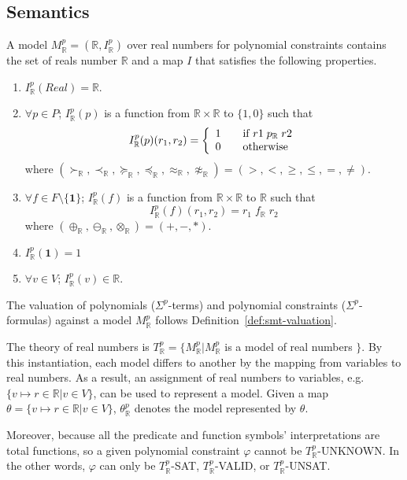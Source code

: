 \subsection{Semantics}
A model $M^p_{\mathbb{R}} = (\mathbb{R}, I^p_{\mathbb{R}})$ over real numbers for polynomial constraints contains the set of reals number $\mathbb{R}$ and a map $I$ that satisfies the following properties.
\begin{enumerate}
\item $I^p_{\mathbb{R}}(Real) = \mathbb{R}$.
\item $\forall p \in P$; $I^p_{\mathbb{R}}(p)$ is a function from $\mathbb{R} \times \mathbb{R}$ to $\{1, 0\}$ such that \[I^p_\mathbb{R}(p)(r_1, r_2) = \left\{ 
  \begin{array}{c l}
    1 & \quad \text{if } r1 \; p_{\mathbb{R}} \; r2\\
    0 & \quad \text{otherwise }\\
  \end{array} \right.\] where $(\succ_\mathbb{R}, \prec_{\mathbb{R}},\succeq_\mathbb{R},\preceq_{\mathbb{R}}, \approx_\mathbb{R}, \not\approx_\mathbb{R}) = (>, <, \ge, \le, =, \neq)$.
\item $\forall f \in F \setminus \{\mathbf{1}\}$; $I^p_{\mathbb{R}}(f)$ is a function from $\mathbb{R} \times \mathbb{R}$ to $\mathbb{R}$ such that \[I^p_{\mathbb{R}}(f)(r_1, r_2)  = r_1 \; f_{\mathbb{R}} \; r_2\] where $(\oplus_{\mathbb{R}}, \ominus_{\mathbb{R}}, \otimes_{\mathbb{R}}) = (+, -, *)$.
\item $I^p_\mathbb{R}(\mathbf{1}) = 1$
\item $\forall v \in V$; $I^p_{\mathbb{R}}(v) \in \mathbb{R}$.
\end{enumerate}
The valuation of polynomials ($\Sigma^p$-terms) and polynomial constraints ($\Sigma^p$-formulas) against a model $M^p_\mathbb{R}$ follows Definition~\ref{def:smt-valuation}. 

The theory of real numbers is $T^p_{\mathbb{R}} = \{M^p_{\mathbb{R}} | M^p_{\mathbb{R}}$ is a model of real numbers $\}$.
By this instantiation, each model differs to another by the mapping from variables to real numbers. As a result, an assignment of real numbers to variables, e.g. $\{v \mapsto r \in \mathbb{R} | v \in V\}$, can be used to represent a model. Given a map $\theta = \{v \mapsto r \in \mathbb{R}| v \in V \}$, $\theta^p_\mathbb{R}$ denotes the model represented by $\theta$.

Moreover, because all the predicate and function symbols' interpretations are total functions, so a given polynomial constraint $\varphi$ cannot be $T^p_\mathbb{R}$-UNKNOWN. In the other words, $\varphi$ can only be $T^p_\mathbb{R}$-SAT, $T^p_\mathbb{R}$-VALID, or $T^p_\mathbb{R}$-UNSAT.

